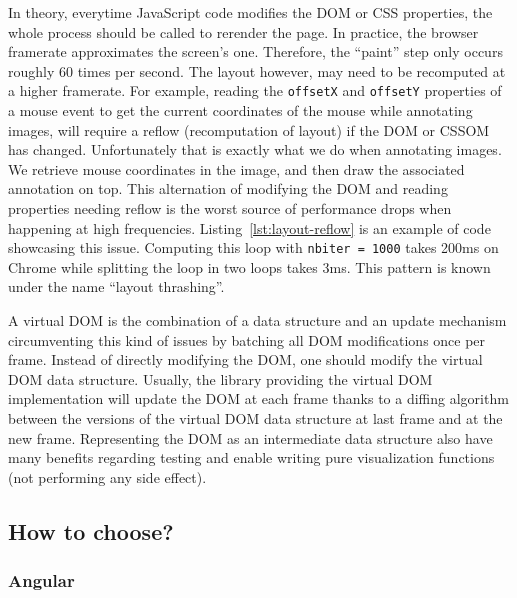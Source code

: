 In theory, everytime JavaScript code modifies the DOM or CSS properties,
the whole process should be called to rerender the page.
In practice, the browser framerate approximates the screen's one.
Therefore, the ``paint'' step only occurs roughly 60 times per second.
The layout however, may need to be recomputed at a higher framerate.
For example, reading the \verb|offsetX| and \verb|offsetY| properties
of a mouse event to get the current coordinates of the mouse while annotating images,
will require a reflow (recomputation of layout) if the DOM or CSSOM has changed.
Unfortunately that is exactly what we do when annotating images.
We retrieve mouse coordinates in the image,
and then draw the associated annotation on top.
This alternation of modifying the DOM and reading properties needing reflow
is the worst source of performance drops when happening at high frequencies.
Listing~\ref{lst:layout-reflow} is an example of code showcasing this issue.
Computing this loop with \verb|nbiter = 1000| takes 200ms on Chrome
while splitting the loop in two loops takes 3ms.
This pattern is known under the name ``layout thrashing''.



A virtual DOM is the combination of a data structure and an update mechanism
circumventing this kind of issues by batching all DOM modifications once per frame.
Instead of directly modifying the DOM,
one should modify the virtual DOM data structure.
Usually, the library providing the virtual DOM implementation will update the DOM at each frame
thanks to a diffing algorithm between the versions of the virtual DOM data structure at last frame
and at the new frame.
Representing the DOM as an intermediate data structure also have many benefits regarding testing
and enable writing pure visualization functions (not performing any side effect).

\subsection{How to choose?}%
\label{sub:how_to_choose_}

\subsubsection{Angular}%
\label{ssub:angular}

